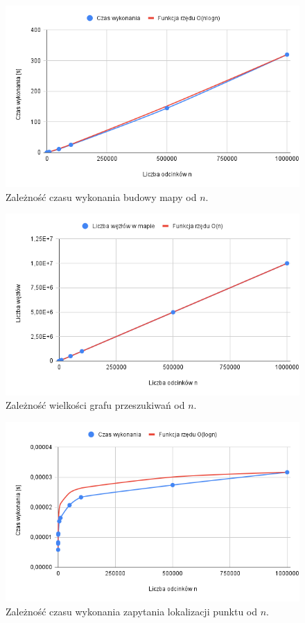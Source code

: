 \documentclass[11pt,a4paper]{article}
\begin{document}
\begin{figure}[H]
    \centering
    \includegraphics[scale=0.46]{./res/figs/build_times_graph.png}
    \caption{Zależność czasu wykonania budowy mapy od $n$.}
\end{figure}

\begin{figure}[H]
    \centering
    \includegraphics[scale=0.46]{./res/figs/build_sizes_graph.png}
    \caption{Zależność wielkości grafu przeszukiwań od $n$.}
\end{figure}

\begin{figure}[H]
    \centering
    \includegraphics[scale=0.46]{./res/figs/query_times_graph.png}
    \caption{Zależność czasu wykonania zapytania lokalizacji punktu od $n$.}
\end{figure}
\end{document}
